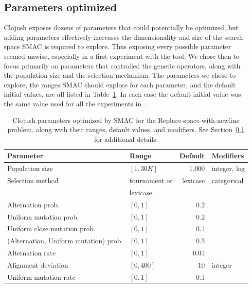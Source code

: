 \subsection{Parameters optimized}
\label{sec:parametersOptimized}

Clojush exposes dozens of parameters that could potentially be optimized, but
adding parameters effectively increases the dimensionality and size of the
search space SMAC is required to explore. Thus exposing every possible parameter
seemed unwise, especially in a first experiment with the tool. We chose then
to focus primarily on parameters that controlled the genetic operators, along
with the population size and the selection mechanism. The parameters we chose 
to explore, the ranges SMAC should explore for each parameter, and the 
default initial values, are all listed in Table~\ref{tab:clojushParameters}.
In each case the default initial value was the same value used for all the
experiments in~\cite{Helmuth:2015:GECCO}.

\begin{table}
	\begin{center}
	\begin{tabular}{l@{\quad} @{\enskip}l@{\quad} @{\enskip}r@{\quad} @{\enskip}l}
		Parameter & Range & Default & Modifiers \\
		\hline
		Population size & $[1, 30K]$ & 1,000 & integer, log \\
		Selection method & tournament or & lexicase & categorical \\
		& \quad lexicase \\
		\hline
		Alternation prob. & $[0, 1]$ & 0.2 \\
		Uniform mutation prob. & $[0, 1]$ & 0.2 \\
		Uniform close mutation prob. & $[0, 1]$ & 0.1 \\
		(Alternation, Uniform mutation) prob. & $[0, 1]$ & 0.5 \\
		\hline
		Alternation rate & $[0, 1]$ & 0.01 \\
		Alignment deviation & $[0, 400]$ & 10 & integer \\
		\hline
		Uniform mutation rate & $[0, 1]$ & 0.1
	\end{tabular}
	\end{center}
	\caption{Clojush parameters optimized by SMAC for the Replace-space-with-newline problem, along with their ranges, 
		default values, and modifiers. See Section~\ref{sec:parametersOptimized} for additional details.}
	\label{tab:clojushParameters}
\end{table}


